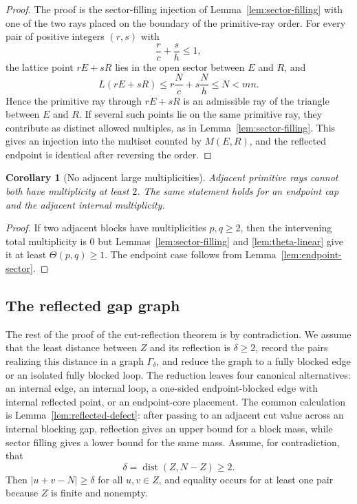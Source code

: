 \documentclass[11pt]{article}
\newtheorem{corollary}[theorem]{Corollary}
\newcommand{\dist}{\operatorname{dist}}
\begin{document}
\begin{proof}
The proof is the sector-filling injection of Lemma~\ref{lem:sector-filling} with one of the two rays placed on the boundary of the primitive-ray order.  For every pair of positive integers $(r,s)$ with
\[
        \frac r c+\frac s h\le1,
\]
the lattice point $rE+sR$ lies in the open sector between $E$ and $R$, and
\[
        L(rE+sR)\le r\frac Nc+s\frac Nh\le N<mn.
\]
Hence the primitive ray through $rE+sR$ is an admissible ray of the triangle between $E$ and $R$.  If several such points lie on the same primitive ray, they contribute as distinct allowed multiples, as in Lemma~\ref{lem:sector-filling}.  This gives an injection into the multiset counted by $M(E,R)$, and the reflected endpoint is identical after reversing the order.
\end{proof}

\begin{corollary}[No adjacent large multiplicities]\label{cor:no-adjacent-large}
Adjacent primitive rays cannot both have multiplicity at least $2$.  The same statement holds for an endpoint cap and the adjacent internal multiplicity.
\end{corollary}

\begin{proof}
If two adjacent blocks have multiplicities $p,q\ge2$, then the intervening total multiplicity is $0$ but Lemmas~\ref{lem:sector-filling} and \ref{lem:theta-linear} give it at least $\Theta(p,q)\ge1$.  The endpoint case follows from Lemma~\ref{lem:endpoint-sector}.
\end{proof}

\subsection{The reflected gap graph}

The rest of the proof of the cut-reflection theorem is by contradiction.  We assume that the least distance between $Z$ and its reflection is $\delta\ge2$, record the pairs realizing this distance in a graph $\Gamma_\delta$, and reduce the graph to a fully blocked edge or an isolated fully blocked loop.  The reduction leaves four canonical alternatives: an internal edge, an internal loop, a one-sided endpoint-blocked edge with internal reflected point, or an endpoint-core placement.  The common calculation is Lemma~\ref{lem:reflected-defect}: after passing to an adjacent cut value across an internal blocking gap, reflection gives an upper bound for a block mass, while sector filling gives a lower bound for the same mass.
Assume, for contradiction, that
\[
        \delta=\dist(Z,N-Z)\ge2.
\]
Then $|u+v-N|\ge\delta$ for all $u,v\in Z$, and equality occurs for at least one pair because $Z$ is finite and nonempty.
\end{document}
